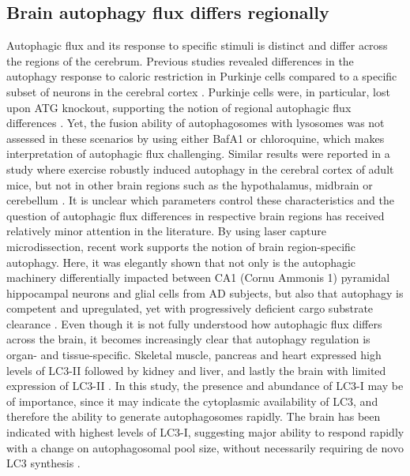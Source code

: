 \subsection{Brain autophagy flux differs regionally}
Autophagic flux and its response to specific stimuli is distinct and differ across the regions of the cerebrum. Previous studies revealed differences in the autophagy response to caloric restriction in Purkinje cells compared to a specific subset of neurons in the cerebral cortex \citep{Alirezaei2010}. Purkinje cells were, in particular, lost upon ATG knockout, supporting the notion of regional autophagic flux differences \citep{Alirezaei2010,Hara2006,Komatsu2006}. Yet, the fusion ability of autophagosomes with lysosomes was not assessed in these scenarios by using either BafA1 or chloroquine, which makes interpretation of autophagic flux challenging. Similar results were reported in a study where exercise robustly induced autophagy in the cerebral cortex of adult mice, but not in other brain regions such as the hypothalamus, midbrain or cerebellum \citep{He2012}. It is unclear which parameters control these characteristics and the question of autophagic flux differences in respective brain regions has received relatively minor attention in the literature. By using laser capture microdissection, recent work supports the notion of brain region-specific autophagy. Here, it was elegantly shown that not only is the autophagic machinery differentially impacted between CA1 (Cornu Ammonis 1) pyramidal hippocampal neurons and glial cells from AD subjects, but also that autophagy is competent and upregulated, yet with progressively deficient cargo substrate clearance \citep{Bordi2016}. Even though it is not fully understood how autophagic flux differs across the brain, it becomes increasingly clear that autophagy regulation is organ- and tissue-specific. Skeletal muscle, pancreas and heart expressed high levels of LC3-II followed by kidney and liver, and lastly the brain with limited expression of LC3-II \citep{Mizushima2004a}. In this study, the presence and abundance of LC3-I may be of importance, since it may indicate the cytoplasmic availability of LC3, and therefore the ability to generate autophagosomes rapidly. The brain has been indicated with highest levels of LC3-I, suggesting major ability to respond rapidly with a change on autophagosomal pool size, without necessarily requiring de novo LC3 synthesis \citep{Mizushima2004a}.


